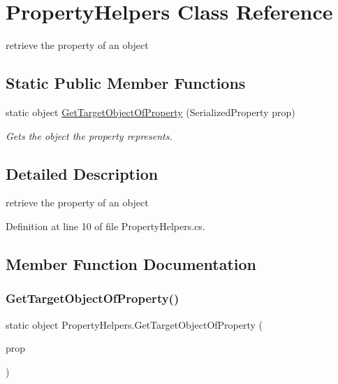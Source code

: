\hypertarget{class_property_helpers}{}\section{Property\+Helpers Class Reference}
\label{class_property_helpers}


retrieve the property of an object  


\subsection*{Static Public Member Functions}
\begin{DoxyCompactItemize}
\item 
static object \mbox{\hyperlink{class_property_helpers_a0b8189bfd3bd5d24da69c682eec31706}{Get\+Target\+Object\+Of\+Property}} (Serialized\+Property prop)
\begin{DoxyCompactList}\small\item\em Gets the object the property represents. \end{DoxyCompactList}\end{DoxyCompactItemize}


\subsection{Detailed Description}
retrieve the property of an object 



Definition at line 10 of file Property\+Helpers.\+cs.



\subsection{Member Function Documentation}
\mbox{\label{class_property_helpers_a0b8189bfd3bd5d24da69c682eec31706}} 
\subsubsection{\texorpdfstring{Get\+Target\+Object\+Of\+Property()}{GetTargetObjectOfProperty()}}
{\footnotesize\ttfamily static object Property\+Helpers.\+Get\+Target\+Object\+Of\+Property (\begin{DoxyParamCaption}\item[{Serialized\+Property}]{prop }\end{DoxyParamCaption})\hspace{0.3cm}{\ttfamily [static]}}



